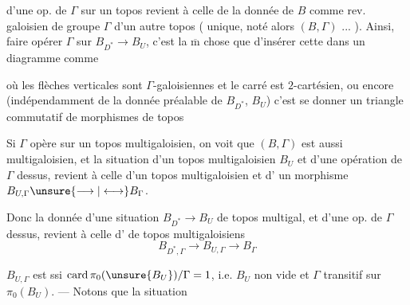 
 d'une op. de $\Gamma$ sur un topos  revient
à celle de la donnée de $B$ comme
rev. galoisien de groupe $\Gamma$ d'un
autre topos ( unique, noté alors
$(B,\Gamma)$ ... ). Ainsi, faire opérer
 $\Gamma$ sur $B_{D^*}\longrightarrow B_U$, c'est
la $\overline{\mathrm m}$ chose que d'insérer cette
  dans un diagramme comme


 où les flèches verticales sont $\Gamma$-galoisiennes
et le carré est $2$-cartésien, ou encore
(indépendamment de la donnée préalable
de $B_{D^*}$, $B_U$) c'est se donner un
triangle  commutatif de morphismes
de topos



Si $\Gamma$ opère sur un topos multigaloisien,
on voit que $(B,\Gamma)$ est aussi
multigaloisien, et la situation d'un
topos multigaloisien $B_U$ et d'une
opération de $\Gamma$ dessus, revient à celle
d'un topos multigaloisien  et d'
un morphisme $B_{U,\Gamma}\unsure{\longrightarrow|\longleftrightarrow}B_\Gamma$.

Donc la donnée d'une situation
$B_{D^*}\longrightarrow B_U$ de topos multigal,
et d'une op. de $\Gamma$ dessus,
revient  à celle d'
de topos multigaloisiens
\[
 B_{D^*,\Gamma}\longrightarrow B_{U,\Gamma}\longrightarrow B_\Gamma
\]

$B_{U,\Gamma}$ est  ssi $\operatorname{card}\pi_0(\unsure{B_U})/\Gamma=1$,
i.e. $B_U$ non vide et $\Gamma$ transitif sur
$\pi_0(B_U)$. --- Notons que la situation

